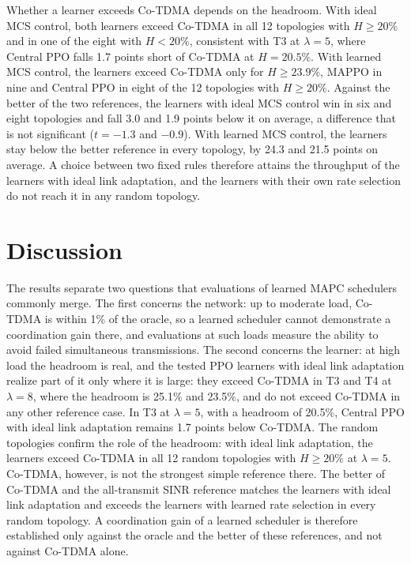 \documentclass{ieeeaccess}
\begin{document}
Whether a learner exceeds Co-TDMA depends on the headroom. With ideal MCS control, both learners exceed Co-TDMA in all 12 topologies with $H \ge 20\%$ and in one of the eight with $H < 20\%$, consistent with T3 at $\lambda = 5$, where Central PPO falls 1.7 points short of Co-TDMA at $H = 20.5\%$. With learned MCS control, the learners exceed Co-TDMA only for $H \ge 23.9\%$, MAPPO in nine and Central PPO in eight of the 12 topologies with $H \ge 20\%$. Against the better of the two references, the learners with ideal MCS control win in six and eight topologies and fall 3.0 and 1.9 points below it on average, a difference that is not significant ($t = -1.3$ and $-0.9$). With learned MCS control, the learners stay below the better reference in every topology, by 24.3 and 21.5 points on average. A choice between two fixed rules therefore attains the throughput of the learners with ideal link adaptation, and the learners with their own rate selection do not reach it in any random topology.

\section{Discussion}
\label{sec:discussion}
The results separate two questions that evaluations of learned MAPC schedulers commonly merge. The first concerns the network: up to moderate load, Co-TDMA is within 1\% of the oracle, so a learned scheduler cannot demonstrate a coordination gain there, and evaluations at such loads measure the ability to avoid failed simultaneous transmissions. The second concerns the learner: at high load the headroom is real, and the tested PPO learners with ideal link adaptation realize part of it only where it is large: they exceed Co-TDMA in T3 and T4 at $\lambda = 8$, where the headroom is 25.1\% and 23.5\%, and do not exceed Co-TDMA in any other reference case. In T3 at $\lambda = 5$, with a headroom of 20.5\%, Central PPO with ideal link adaptation remains 1.7 points below Co-TDMA. The random topologies confirm the role of the headroom: with ideal link adaptation, the learners exceed Co-TDMA in all 12 random topologies with $H \ge 20\%$ at $\lambda = 5$. Co-TDMA, however, is not the strongest simple reference there. The better of Co-TDMA and the all-transmit SINR reference matches the learners with ideal link adaptation and exceeds the learners with learned rate selection in every random topology. A coordination gain of a learned scheduler is therefore established only against the oracle and the better of these references, and not against Co-TDMA alone.
\end{document}
